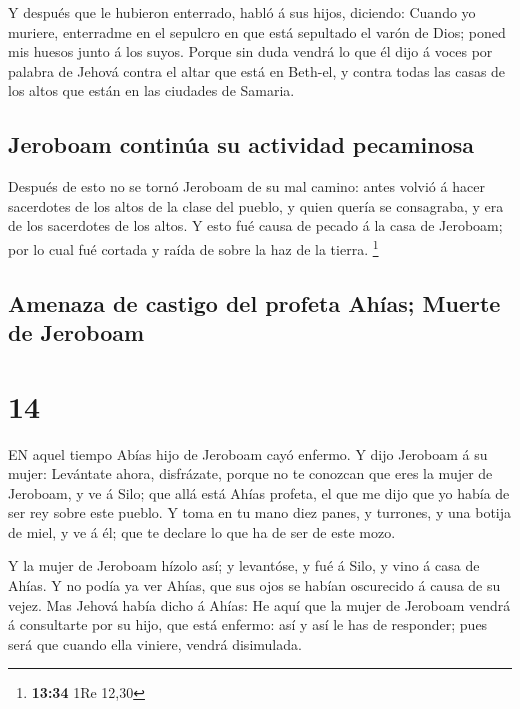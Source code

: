  Y después que le hubieron enterrado, habló á sus hijos,
diciendo: Cuando yo muriere, enterradme en el sepulcro en que está
sepultado el varón de Dios; poned mis huesos junto á los suyos.
 Porque sin duda vendrá lo que él dijo á voces por palabra
de Jehová contra el altar que está en Beth-el, y contra todas las casas
de los altos que están en las ciudades de Samaria.

\hypertarget{jeroboam-continuxfaa-su-actividad-pecaminosa}{%
\subsection{Jeroboam continúa su actividad
pecaminosa}\label{jeroboam-continuxfaa-su-actividad-pecaminosa}}

 Después de esto no se tornó Jeroboam de su mal camino:
antes volvió á hacer sacerdotes de los altos de la clase del pueblo, y
quien quería se consagraba, y era de los sacerdotes de los altos.
 Y esto fué causa de pecado á la casa de Jeroboam; por lo
cual fué cortada y raída de sobre la haz de la tierra. \footnote{\textbf{13:34}
  1Re 12,30}

\hypertarget{amenaza-de-castigo-del-profeta-ahuxedas-muerte-de-jeroboam}{%
\subsection{Amenaza de castigo del profeta Ahías; Muerte de
Jeroboam}\label{amenaza-de-castigo-del-profeta-ahuxedas-muerte-de-jeroboam}}

\hypertarget{section-13}{%
\section{14}\label{section-13}}

 EN aquel tiempo Abías hijo de Jeroboam cayó enfermo.
 Y dijo Jeroboam á su mujer: Levántate ahora, disfrázate,
porque no te conozcan que eres la mujer de Jeroboam, y ve á Silo; que
allá está Ahías profeta, el que me dijo que yo había de ser rey sobre
este pueblo.  Y toma en tu mano diez panes, y turrones, y
una botija de miel, y ve á él; que te declare lo que ha de ser de este
mozo.

 Y la mujer de Jeroboam hízolo así; y levantóse, y fué á
Silo, y vino á casa de Ahías. Y no podía ya ver Ahías, que sus ojos se
habían oscurecido á causa de su vejez.  Mas Jehová había
dicho á Ahías: He aquí que la mujer de Jeroboam vendrá á consultarte por
su hijo, que está enfermo: así y así le has de responder; pues será que
cuando ella viniere, vendrá disimulada.

